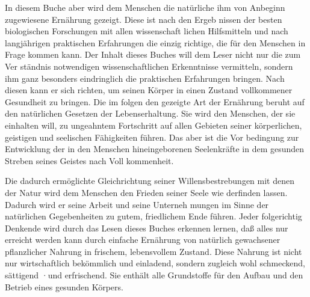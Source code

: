 In diesem Buche aber wird dem Menschen die natürliche ihm von
Anbeginn zugewiesene Ernährung gezeigt. Diese ist nach den Ergeb­
nissen der besten biologischen Forschungen mit allen wissenschaft­
lichen Hilfsmitteln und nach langjährigen praktischen Erfahrungen
die einzig richtige, die für den Menschen in Frage kommen kann.
Der Inhalt dieses Buches will dem Leser nicht nur die zum Ver­
ständnis notwendigen wissenschaftlichen Erkenntnisse vermitteln,
sondern ihm ganz besonders eindringlich die praktischen Erfahrungen
bringen. Nach diesen kann er sich richten, um seinen Körper in
einen Zustand vollkommener Gesundheit zu bringen. Die im folgen­
den gezeigte Art der Ernährung beruht auf den natürlichen Gesetzen
der Lebenserhaltung. Sie wird den Menschen, der sie einhalten will,
zu ungeahntem Fortschritt auf allen Gebieten seiner körperlichen,
geistigen und seelischen Fähigkeiten führen. Das aber ist die Vor­
bedingung zur Entwicklung der in den Menschen hineingeborenen
Seelenkräfte in dem gesunden Streben seines Geistes nach Voll­
kommenheit.

Die dadurch ermöglichte Gleichrichtung seiner Willensbestrebungen
mit denen der Natur wird dem Menschen den Frieden seiner Seele wie­
derfinden lassen. Dadurch wird er seine Arbeit und seine Unterneh­
mungen im Sinne der natürlichen Gegebenheiten zu gutem, friedlichem
Ende führen. Jeder folgerichtig Denkende wird durch das Lesen
dieses Buches erkennen lernen, daß alles nur erreicht werden kann
durch einfache Ernährung von natürlich gewachsener pflanzlicher
Nahrung in frischem, lebensvollem Zustand. Diese Nahrung ist nicht
nur wirtschaftlich bekömmlich und einladend, sondern zugleich wohl­
schmeckend, sättigend ·und erfrischend. Sie enthält alle Grundstoffe
für den Aufbau und den Betrieb eines gesunden Körpers.

